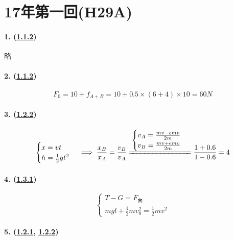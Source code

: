 
\section{17年第一回(H29A)}

\paragraph{1. (\hyperref[subsec:1.1.2]{1.1.2})} 略
\paragraph{2. (\hyperref[subsec:1.1.2]{1.1.2})}

\begin{equation*}
    F_0=10+f_{A+B}=10+0.5\times(6+4)\times10=60N
\end{equation*}

\paragraph{3. (\hyperref[subsec:1.2.2]{1.2.2})}

\begin{gather*}
    \begin{cases}
        x=vt\\h=\frac12gt^2
    \end{cases}\implies
    \frac{x_B}{x_A}=\frac{v_B}{v_A}
    \xlongequal{\begin{cases}
        v_A=\frac{mv-emv}{2m}\\
        v_B=\frac{mv+emv}{2m}
    \end{cases}}
    \frac{1+0.6}{1-0.6}=4
\end{gather*}

\paragraph{4. (\hyperref[subsec:1.3.1]{1.3.1})}

\begin{equation*}
    \begin{cases}
        T-G=F_\textrm{向}\\
        mgl+\frac12mv_0^2=\frac12mv^2
    \end{cases}
\end{equation*}

\paragraph{5. (\hyperref[subsec:1.2.1]{1.2.1}, \hyperref[subsec:1.2.2]{1.2.2})}

